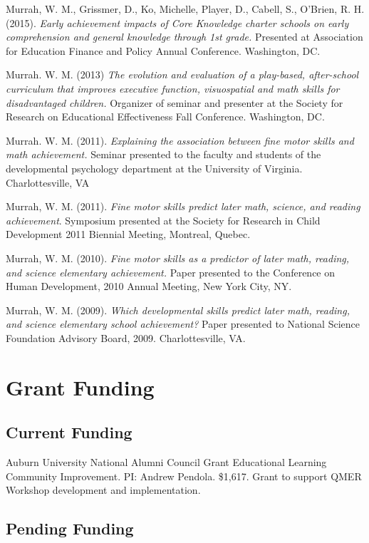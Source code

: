 \documentclass[11pt,]{article}
\begin{document}
Murrah, W. M., Grissmer, D., Ko, Michelle, Player, D., Cabell, S.,
O'Brien, R. H.(2015). \emph{Early achievement impacts of Core Knowledge
charter schools on early comprehension and general knowledge through 1st
grade.} Presented at Association for Education Finance and Policy Annual
Conference. Washington, DC.

Murrah. W. M. (2013) \emph{The evolution and evaluation of a play-based,
after-school curriculum that improves executive function, visuospatial
and math skills for disadvantaged children.} Organizer of seminar and
presenter at the Society for Research on Educational Effectiveness Fall
Conference. Washington, DC.

Murrah. W. M. (2011). \emph{Explaining the association between fine
motor skills and math achievement.} Seminar presented to the faculty and
students of the developmental psychology department at the University of
Virginia. Charlottesville, VA

Murrah, W. M. (2011). \emph{Fine motor skills predict later math,
science, and reading achievement}. Symposium presented at the Society
for Research in Child Development 2011 Biennial Meeting, Montreal,
Quebec.

Murrah, W. M. (2010). \emph{Fine motor skills as a predictor of later
math, reading, and science elementary achievement.} Paper presented to
the Conference on Human Development, 2010 Annual Meeting, New York City,
NY.

Murrah, W. M. (2009). \emph{Which developmental skills predict later
math, reading, and science elementary school achievement?} Paper
presented to National Science Foundation Advisory Board, 2009.
Charlottesville, VA.

\hypertarget{grant-funding}{%
\section{Grant Funding}\label{grant-funding}}

\hypertarget{current-funding}{%
\subsection{Current Funding}\label{current-funding}}

Auburn University National Alumni Council Grant Educational Learning
Community Improvement. PI: Andrew Pendola. \$1,617. Grant to support
QMER Workshop development and implementation.

\hypertarget{pending-funding}{%
\subsection{Pending Funding}\label{pending-funding}}
\end{document}
